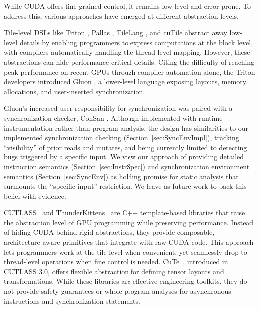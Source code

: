 

While CUDA offers fine-grained control, it remains low-level and error-prone.
To address this, various approaches have emerged at different abstraction levels.

Tile-level DSLs like Triton \cite{triton}, Pallas \cite{pallas}, TileLang \cite{tilelang}, and cuTile \cite{cutile}
abstract away low-level details by enabling programmers to express computations at the block level,
with compilers automatically handling the thread-level mapping.
However, these abstractions can hide performance-critical details.
Citing the difficulty of reaching peak performance on recent GPUs through compiler automation alone,
the Triton developers introduced Gluon \cite{triton:gluon_update},
a lower-level language exposing layouts, memory allocations, and user-inserted synchronization.

Gluon's increased user responsibility for synchronization was paired with a synchronization checker,
ConSan \cite{triton:consan}.
Although implemented with runtime instrumentation rather than program analysis,
the design has similarities to our implemented synchronization checking (Section~\ref{sec:SyncEnvImpl}),
tracking ``visibility'' of prior reads and mutates,
and being currently limited to detecting bugs triggered by a specific input.
We view our approach of providing detailed instruction semantics (Section~\ref{sec:InstrSpec})
and synchronization environment semantics (Section~\ref{sec:SyncEnv})
as holding promise for static analysis that surmounts the ``specific input'' restriction.
We leave as future work to back this belief with evidence.

CUTLASS~\cite{cutlass} and ThunderKittens~\cite{thunderkittens} are C++ template-based libraries that raise the abstraction level of GPU programming while preserving performance.
Instead of hiding CUDA behind rigid abstractions, they provide composable, architecture-aware primitives that integrate with raw CUDA code.
This approach lets programmers work at the tile level when convenient, yet seamlessly drop to thread-level operations when fine control is needed.
%
CuTe~\cite{cute}, introduced in CUTLASS 3.0, offers flexible abstraction for defining tensor layouts and transformations.
%
While these libraries are effective engineering toolkits, they do not provide safety guarantees or whole-program analyses for asynchronous instructions and synchronization statements.


